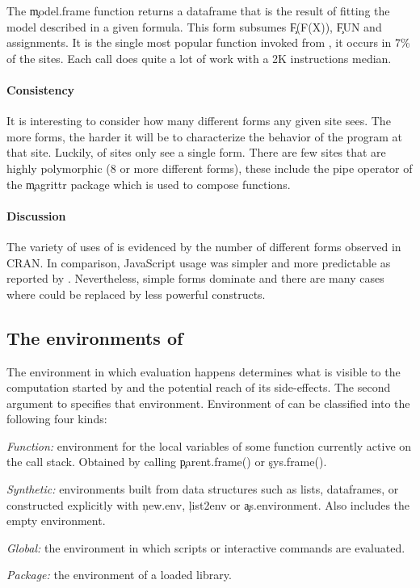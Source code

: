 \documentclass[review,nonacm,screen,acmsmall,anonymous=true]{acmart}
\begin{document}
\medskip\noindent{} The \c{model.frame} function
returns a dataframe that is the result of fitting the model described in a given
formula. This form subsumes \c{F(F(X))}, \c{FUN} and assignments. It is the
single most popular function invoked from \eval, it occurs in 7\% of the sites.
Each call does quite a lot of work with a 2K instructions median.

\paragraph{Consistency} It is interesting to consider how many different
forms any given site sees. The more forms, the harder it will be to characterize
the behavior of the program at that site. Luckily, \packageNbOneMinimizedPercent
of sites only see a single form. There are few sites that are highly polymorphic
(8 or more different forms), these include the pipe operator of the \c{magrittr}
package which is used to compose functions.

\paragraph{Discussion} The variety of uses of \eval is evidenced by the number
of different forms observed in CRAN. In comparison, JavaScript \eval usage was
simpler and more predictable as reported by \citet{oopsla12b}. Nevertheless,
simple forms dominate and there are many cases where \eval could be replaced
by less powerful constructs.


\newpage

\subsection{The environments of \eval}\label{sec:env}

The environment in which evaluation happens determines what is visible to the
computation started by \eval and the potential reach of its side-effects. The
second argument to \eval specifies that environment. Environment of \eval can be
classified into the following four kinds:

\begin{compactitem}[---]
\item \emph{Function:} environment for the local variables of some function
  currently active on the call stack. Obtained by calling \c{parent.frame()} or
  \c{sys.frame()}.
\item \emph{Synthetic:} environments built from data structures such as lists,
  dataframes, or constructed explicitly with \c{new.env}, \c{list2env} or
  \c{as.environment}. Also includes the empty environment.
\item \emph{Global:} the environment in which scripts or interactive commands
  are evaluated.
\item \emph{Package:} the environment of a loaded library.
\end{compactitem}
\end{document}
